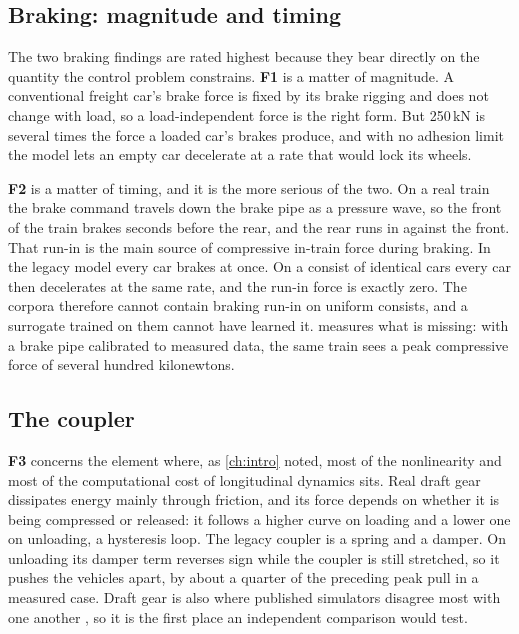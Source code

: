 \subsection{Braking: magnitude and timing}

The two braking findings are rated highest because they bear directly on the quantity the control problem constrains. \textbf{F1} is a matter of magnitude. A conventional freight car's brake force is fixed by its brake rigging and does not change with load, so a load-independent force is the right form. But 250\,kN is several times the force a loaded car's brakes produce, and with no adhesion limit the model lets an empty car decelerate at a rate that would lock its wheels.

\textbf{F2} is a matter of timing, and it is the more serious of the two. On a real train the brake command travels down the brake pipe as a pressure wave, so the front of the train brakes seconds before the rear, and the rear runs in against the front. That run-in is the main source of compressive in-train force during braking. In the legacy model every car brakes at once. On a consist of identical cars every car then decelerates at the same rate, and the run-in force is exactly zero. The corpora therefore cannot contain braking run-in on uniform consists, and a surrogate trained on them cannot have learned it.  measures what is missing: with a brake pipe calibrated to measured data, the same train sees a peak compressive force of several hundred kilonewtons.

\subsection{The coupler}

\textbf{F3} concerns the element where, as \cref{ch:intro} noted, most of the nonlinearity and most of the computational cost of longitudinal dynamics sits. Real draft gear dissipates energy mainly through friction, and its force depends on whether it is being compressed or released: it follows a higher curve on loading and a lower one on unloading, a hysteresis loop. The legacy coupler is a spring and a damper. On unloading its damper term reverses sign while the coupler is still stretched, so it pushes the vehicles apart, by about a quarter of the preceding peak pull in a measured case. Draft gear is also where published simulators disagree most with one another \cite{Wu2018BenchmarkResults}, so it is the first place an independent comparison would test.

